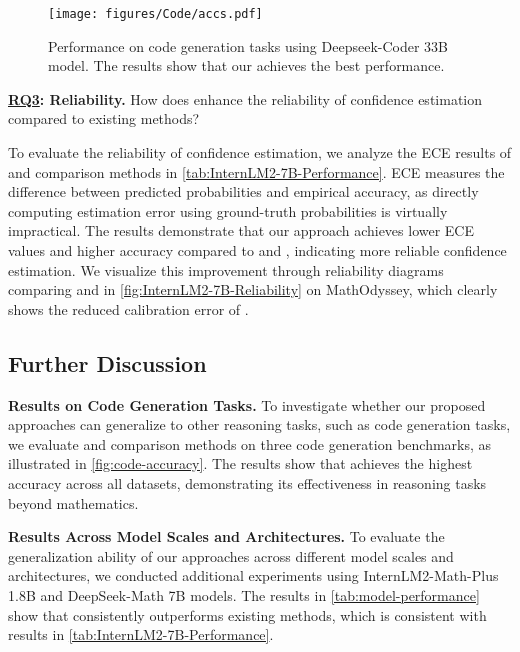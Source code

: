 \begin{figure}[t]
    \vskip 0.1in
    \begin{center}
    \centerline{\texttt{[image: figures/Code/accs.pdf]}}
    \caption{Performance on code generation tasks using Deepseek-Coder 33B model. The results show that our \RPC achieves the best performance.}
    \label{fig:code-accuracy}
    \end{center}
    \vskip -0.3in
\end{figure}

\textbf{\underline{RQ3}: Reliability.} How does \RPC enhance the reliability of confidence estimation compared to existing methods?

To evaluate the reliability of confidence estimation, we analyze the ECE results of \RPC and comparison methods in \autoref{tab:InternLM2-7B-Performance}. ECE measures the difference between predicted probabilities and empirical accuracy, as directly computing estimation error using ground-truth probabilities is virtually impractical. The results demonstrate that our \RPC approach achieves lower ECE values and higher accuracy compared to \PP and \SC, indicating more reliable confidence estimation. We visualize this improvement through reliability diagrams comparing \SC and \RPC in \autoref{fig:InternLM2-7B-Reliability} on MathOdyssey, which clearly shows the reduced calibration error of \RPC.

\subsection{Further Discussion}

\textbf{Results on Code Generation Tasks.}
To investigate whether our proposed approaches can generalize to other reasoning tasks, such as code generation tasks, we evaluate \RPC and comparison methods on three code generation benchmarks, as illustrated in \autoref{fig:code-accuracy}. The results show that \RPC achieves the highest accuracy across all datasets, demonstrating its effectiveness in reasoning tasks beyond mathematics. 

\textbf{Results Across Model Scales and Architectures.}
To evaluate the generalization ability of our approaches across different model scales and architectures, we conducted additional experiments using InternLM2-Math-Plus 1.8B and DeepSeek-Math 7B models. The results in \autoref{tab:model-performance} show that \RPC consistently outperforms existing methods, which is consistent with results in \autoref{tab:InternLM2-7B-Performance}.
